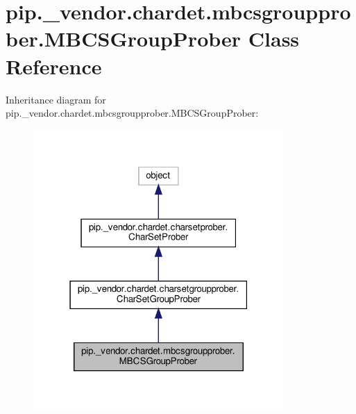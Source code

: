 \hypertarget{classpip_1_1__vendor_1_1chardet_1_1mbcsgroupprober_1_1MBCSGroupProber}{}\section{pip.\+\_\+vendor.\+chardet.\+mbcsgroupprober.\+M\+B\+C\+S\+Group\+Prober Class Reference}
\label{classpip_1_1__vendor_1_1chardet_1_1mbcsgroupprober_1_1MBCSGroupProber}


Inheritance diagram for pip.\+\_\+vendor.\+chardet.\+mbcsgroupprober.\+M\+B\+C\+S\+Group\+Prober\+:
\nopagebreak
\begin{figure}[H]
\begin{center}
\leavevmode
\includegraphics[width=271pt]{classpip_1_1__vendor_1_1chardet_1_1mbcsgroupprober_1_1MBCSGroupProber__inherit__graph}
\end{center}
\end{figure}


